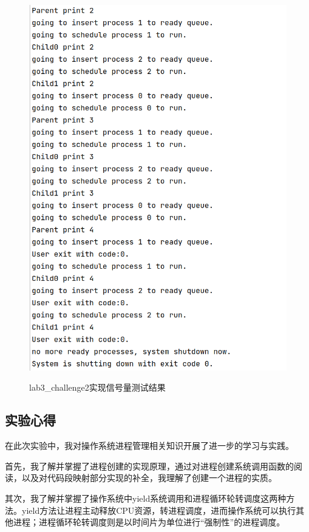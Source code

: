 \begin{figure}[H]
{    \includegraphics[scale=0.5]{figure/lab3_c2_testresult2l.png}}
  \caption{lab3_challenge2实现信号量测试结果}
  \label{fig:lab3-c2} 
\end{figure}


\subsection{实验心得}
在此次实验中，我对操作系统进程管理相关知识开展了进一步的学习与实践。

首先，我了解并掌握了进程创建的实现原理，通过对进程创建系统调用函数的阅读，以及对代码段映射部分实现的补全，我理解了创建一个进程的实质。

其次，我了解并掌握了操作系统中yield系统调用和进程循环轮转调度这两种方法。yield方法让进程主动释放CPU资源，转进程调度，进而操作系统可以执行其他进程；进程循环轮转调度则是以时间片为单位进行“强制性”的进程调度。


